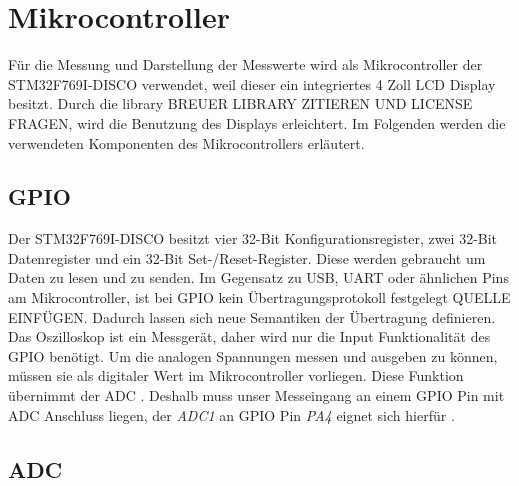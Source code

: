 \section{Mikrocontroller}

Für die Messung und Darstellung der Messwerte wird als Mikrocontroller der STM32F769I-DISCO verwendet,
weil dieser ein integriertes 4 Zoll LCD Display besitzt\cite{MikroControllerDatasheet_1}.
Durch die library BREUER LIBRARY ZITIEREN UND LICENSE FRAGEN, wird die Benutzung des Displays erleichtert.
Im Folgenden werden die verwendeten Komponenten des Mikrocontrollers erläutert.

\subsection{GPIO}
Der STM32F769I-DISCO besitzt vier 32-Bit Konfigurationsregister, zwei 32-Bit Datenregister und ein 32-Bit Set-/Reset-Register.
Diese werden gebraucht um Daten zu lesen und zu senden.
Im Gegensatz zu USB, UART oder ähnlichen Pins am Mikrocontroller, ist bei GPIO kein
Übertragungsprotokoll festgelegt QUELLE EINFÜGEN. \newline
Dadurch lassen sich neue Semantiken der Übertragung definieren. \newline
Das Oszilloskop ist ein Messgerät, daher wird nur die Input Funktionalität des GPIO benötigt.
Um die analogen Spannungen messen und ausgeben zu können, müssen sie als digitaler Wert
im Mikrocontroller vorliegen. \newline Diese Funktion übernimmt der ADC \cite{MikroControllerDatasheet_1}.
Deshalb muss unser Messeingang an einem GPIO Pin mit ADC Anschluss liegen, der \textit{ADC1} an GPIO Pin
\textit{PA4} eignet sich hierfür \cite{STM32F769_PinLayout, MikroControllerDatasheet_Pins}.

\subsection{ADC}


